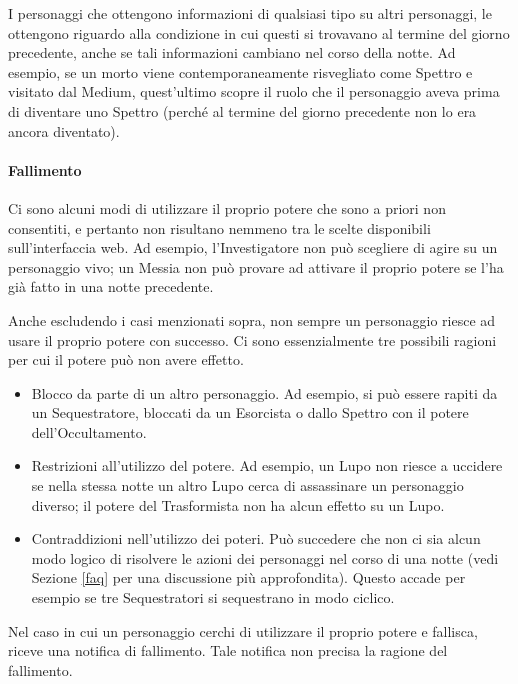\documentclass[a4paper,10pt]{article}
\begin{document}
I personaggi che ottengono informazioni di qualsiasi tipo su altri personaggi, le ottengono riguardo alla condizione in cui questi si trovavano al termine del giorno precedente, anche se tali informazioni cambiano nel corso della notte.
Ad esempio, se un morto viene contemporaneamente risvegliato come Spettro e visitato dal Medium, quest'ultimo scopre il ruolo che il personaggio aveva prima di diventare uno Spettro (perché al termine del giorno precedente non lo era ancora diventato).


\paragraph{Fallimento} Ci sono alcuni modi di utilizzare il proprio potere che sono a priori non consentiti, e pertanto non risultano nemmeno tra le scelte disponibili sull'interfaccia web. Ad esempio, l'Investigatore non può scegliere di agire su un personaggio vivo; un Messia non può provare ad attivare il proprio potere se l'ha già fatto in una notte precedente.

Anche escludendo i casi menzionati sopra, non sempre un personaggio riesce ad usare il proprio potere con successo. Ci sono essenzialmente tre possibili ragioni per cui il potere può non avere effetto.

\begin{itemize}
 \item Blocco da parte di un altro personaggio. Ad esempio, si può essere rapiti da un Sequestratore, bloccati da un Esorcista o dallo Spettro con il potere dell'Occultamento.
 \item Restrizioni all'utilizzo del potere. Ad esempio, un Lupo non riesce a uccidere se nella stessa notte un altro Lupo cerca di assassinare un personaggio diverso; il potere del Trasformista non ha alcun effetto su un Lupo.
 \item Contraddizioni nell'utilizzo dei poteri. Può succedere che non ci sia alcun modo logico di risolvere le azioni dei personaggi nel corso di una notte (vedi Sezione \ref{faq} per una discussione più approfondita). Questo accade per esempio se tre Sequestratori si sequestrano in modo ciclico.
\end{itemize}
Nel caso in cui un personaggio cerchi di utilizzare il proprio potere e fallisca, riceve una notifica di fallimento. Tale notifica non precisa la ragione del fallimento.
\end{document}
